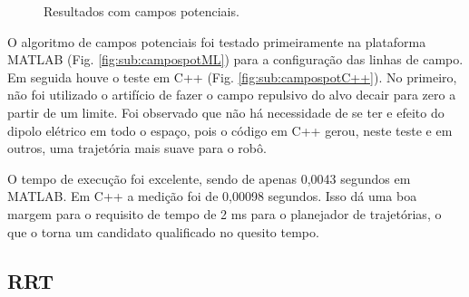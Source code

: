 \documentclass[a4paper,12pt]{article}
\begin{document}
\begin{figure}
\caption{Resultados com campos potenciais.}
\end{figure}
    
O algoritmo de campos potenciais foi testado primeiramente na plataforma MATLAB (Fig. \ref{fig:sub:campospotML}) para a configuração das linhas de campo. Em seguida houve o teste em C++ (Fig. \ref{fig:sub:campospotC++}). No primeiro, não foi utilizado o artifício de fazer o campo repulsivo do alvo decair para zero a partir de um limite. Foi observado que não há necessidade de se ter e efeito do dipolo elétrico em todo o espaço, pois o código em C++ gerou, neste teste e em outros, uma trajetória mais suave para o robô.

O tempo de execução foi excelente, sendo de apenas 0,0043 segundos em MATLAB. Em C++ a medição foi de 0,00098 segundos. Isso dá uma boa margem para o requisito de tempo de 2 ms para o planejador de trajetórias, o que o torna um candidato qualificado no quesito tempo.
    
\subsection{RRT}
\end{document}
